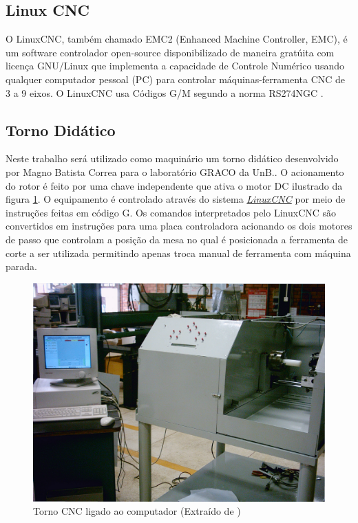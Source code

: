\documentclass[a4paper,11pt]{article}
\begin{document}
\subsection{Linux CNC}\label{sec:linuxCNC}
O LinuxCNC, também chamado EMC2 (Enhanced Machine Controller, EMC), é um software controlador open-source disponibilizado de maneira gratúita com licença GNU/Linux que implementa a capacidade de Controle Numérico usando qualquer computador pessoal (PC) para controlar máquinas-ferramenta CNC de 3 a 9 eixos. O LinuxCNC usa Códigos G/M segundo a norma RS274NGC \cite{linuxcnc_2016}.

\subsection{Torno Didático}
Neste trabalho será utilizado como maquinário um torno didático desenvolvido por Magno Batista Correa para o laboratório GRACO da UnB.\cite{correia_2006}. O acionamento do rotor é feito por uma chave independente que ativa o motor DC ilustrado da figura \ref{fig:tornoCNC-pc}. O equipamento é controlado através do sistema \hyperref[sec:linuxCNC]{\textit{LinuxCNC}} por meio de instruções feitas em código G. Os comandos interpretados pelo LinuxCNC são convertidos em instruções para uma placa controladora acionando os dois motores de passo que controlam a posição da mesa no qual é posicionada a ferramenta de corte a ser utilizada permitindo apenas troca manual de ferramenta com máquina parada. 

\begin{figure}[H]
    \centering
    \includegraphics[width = 0.6\linewidth]{img/relat1/tornocnc}
    \caption{Torno CNC ligado ao computador (Extraído de \cite{correia_2006})}
    \label{fig:tornoCNC-pc}
\end{figure}
\end{document}
